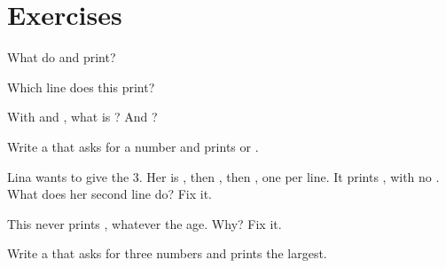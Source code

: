 \section{Exercises}

\begin{exercise}[$\star$]\label{exo:g6:if-else:1}
What do  and  print?
\end{exercise}

\begin{exercise}[$\star$]\label{exo:g6:if-else:2}
Which line does this  print?

\label{lst:g6:if-else:which}
\end{exercise}

\begin{exercise}[$\star$]\label{exo:g6:if-else:3}
With  and , what is ? And
?
\end{exercise}

\begin{exercise}[$\star$]\label{exo:g6:if-else:4}
Write a  that asks for a number and prints  or
.
\end{exercise}

\begin{exercise}[$\star\star$]\label{exo:g6:if-else:5}
Lina wants to give  the  3. Her  is , then
, then , one per line. It prints , with no
. What does her second line do? Fix it.
\end{exercise}

\begin{exercise}[$\star\star$]\label{exo:g6:if-else:6}
This  never prints , whatever the age. Why? Fix it.

\label{lst:g6:if-else:senior-bug}
\end{exercise}

\begin{exercise}[$\star\star$]\label{exo:g6:if-else:7}
Write a  that asks for three numbers and prints the largest.
\end{exercise}

